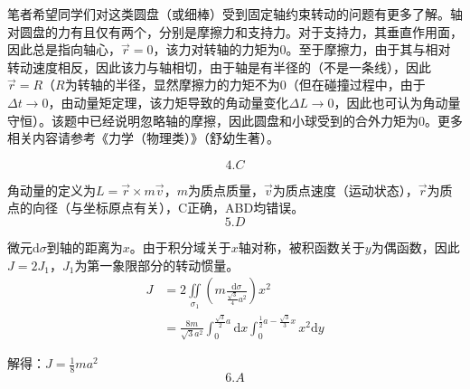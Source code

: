\documentclass[b5paper,opensource]{./template/qyxf-book}
\newcommand{\di}[1]{\mathrm{d}#1}
\newcommand{\zbj}[4]
{
	\draw (0,0) node[below left] {$ O $};
	\draw [->] (#1,0) -- (#2,0) node[right] {$ x $};
	\draw [->] (0,#3) -- (0,#4) node[right] {$ y $};
}
\begin{document}
		\begin{note}
		笔者希望同学们对这类圆盘（或细棒）受到固定轴约束转动的问题有更多了解。轴对圆盘的力有且仅有两个，分别是摩擦力和支持力。对于支持力，其垂直作用面，因此总是指向轴心，$ \vec{r}=0 $，该力对转轴的力矩为0。至于摩擦力，由于其与相对转动速度相反，因此该力与轴相切，由于轴是有半径的（不是一条线），因此$ \vec{r}=R $（$R$为转轴的半径，显然摩擦力的力矩不为0（但在碰撞过程中，由于$ \Delta t\to 0 $，由动量矩定理，该力矩导致的角动量变化$ \Delta L\to 0 $，因此也可认为角动量守恒）。该题中已经说明忽略轴的摩擦，因此圆盘和小球受到的合外力矩为0。更多相关内容请参考《力学（物理类）》（舒幼生著）。
		\end{note}
		\[4.C\]\par
		角动量的定义为$ L=\vec{r}\times m\vec{v} $，$ m $为质点质量，$ \vec{v} $为质点速度（运动状态），$ \vec{r} $为质点的向径（与坐标原点有关），C正确，ABD均错误。
		\[5.D\]\par
		\par
		微元$ \di{\sigma} $到轴的距离为$ x $。由于积分域关于$ x $轴对称，被积函数关于$ y $为偶函数，因此$ J=2J_1 $，$ J_1 $为第一象限部分的转动惯量。
		\begin{align*}
		J&=2\iint\limits_{\sigma_1}\left(m\frac{\di{\sigma}}{\frac{\sqrt{3}}{4}a^2}\right)x^2\\
		&=\frac{8m}{\sqrt{3}a^2}\int_0^{\frac{\sqrt{3}}{2}a}\di{x}\int_0^{\frac{1}{2}a-\frac{\sqrt{3}}{3}x}x^2\di{y}
		\end{align*}\par
		解得：$ J=\frac{1}{8}ma^2 $
		\[6.A\]\par
\end{document}
